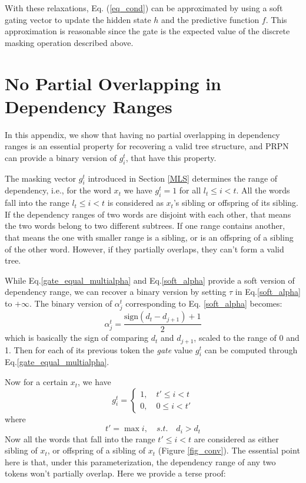 \documentclass{article} \usepackage{iclr2018_conference,times}
\begin{document}
With these relaxations, Eq. (\ref{eq_cond}) can be approximated by using a soft gating vector to update the hidden state $h$ and the predictive function $f$. This approximation is reasonable since the gate is the expected value of the discrete masking operation described above.


\section{No Partial Overlapping in Dependency Ranges} \label{appendix_overlap}
In this appendix, we show that having no partial overlapping in dependency ranges is an essential property for recovering a valid tree structure, and PRPN can provide a binary version of $g_i^{t}$, that have this property.

The masking vector $g_i^{t}$ introduced in Section \ref{MLS} determines the range of dependency, i.e., for the word $x_{t}$ we have $g_i^{t}=1$ for all $l_t \le i < t$. All the words fall into the range $l_t \le i < t$ is considered as $x_t$'s sibling or offspring of its sibling. If the dependency ranges of two words are disjoint with each other, that means the two words belong to two different subtrees. If one range contains another, that means the one with smaller range is a sibling, or is an offspring of a sibling of the other word. However, if they partially overlaps, they can't form a valid tree. 


While Eq.\ref{gate_equal_multialpha} and Eq.\ref{soft_alpha} provide a soft version of dependency range, we can recover a binary version by setting $\tau$ in Eq.\ref{soft_alpha} to $+\infty$. The binary version of $\alpha_j^t$ corresponding to Eq. \ref{soft_alpha} becomes:
\begin{equation}  \label{hard_alpha}
\alpha_j^t = \frac{\mathrm{sign} \left( d_t - d_{j+1} \right) + 1}{2}
\end{equation}
which is basically the sign of comparing $d_t$ and $d_{j+1}$, scaled to the range of 0 and 1. Then for each of its previous token the \emph{gate} value $g_i^t$ can be computed through Eq.\ref{gate_equal_multialpha}. 

Now for a certain $x_t$, we have 
\begin{equation}
g_i^t= \begin{cases} 1,\quad t' \le i < t \\  0,\quad 0 \le i < t' \end{cases}
\end{equation}
where
\begin{equation}
t'= \max{i}, \quad s.t. \quad d_i > d_t
\end{equation}
Now all the words that fall into the range $t' \le i < t$ are considered as either sibling of $x_t$, or offspring of a sibling of $x_t$ (Figure \ref{fig_conv}). The essential point here is that, under this parameterization, the dependency range of any two tokens won't partially overlap. Here we provide a terse proof:
\end{document}
